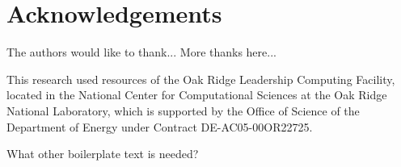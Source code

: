 \section*{Acknowledgements}
\label{sec:ack}

The authors would like to thank... More thanks here...

This research used resources of the Oak Ridge Leadership Computing Facility,
located in the National Center for Computational Sciences at the Oak Ridge
National Laboratory, which is supported by the Office of Science of the
Department of Energy under Contract DE-AC05-00OR22725.

What other boilerplate text is needed?


